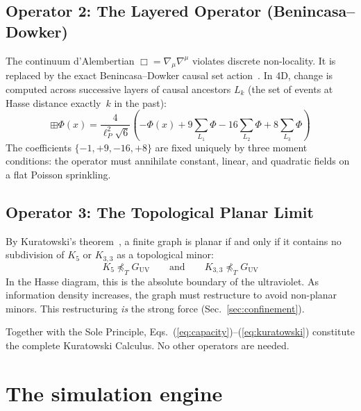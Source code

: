 \documentclass[aps,prd,twocolumn,superscriptaddress,nofootinbib,amsmath,amssymb,longbibliography]{revtex4-2}
\newcommand{\lp}{\ell_P}
\begin{document}
\subsection{Operator 2: The Layered Operator (Benincasa--Dowker)}

The continuum d'Alembertian $\Box = \nabla_\mu \nabla^\mu$ violates
discrete non-locality.  It is replaced by the exact Benincasa--Dowker
causal set action~\cite{benincasa2010}.
In 4D, change is computed across successive layers of causal ancestors
$L_k$ (the set of events at Hasse distance exactly~$k$ in the past):
\begin{equation}\label{eq:box}
  \boxplus\Phi(x) = \frac{4}{\lp^2\sqrt{6}}\left(
    -\Phi(x)
    + 9\!\sum_{L_1}\!\Phi
    - 16\!\sum_{L_2}\!\Phi
    + 8\!\sum_{L_3}\!\Phi
  \right)
\end{equation}
The coefficients $\{-1, +9, -16, +8\}$ are fixed uniquely by three
moment conditions: the operator must annihilate constant, linear,
and quadratic fields on a flat Poisson sprinkling.

\subsection{Operator 3: The Topological Planar Limit}

By Kuratowski's theorem~\cite{kuratowski1930}, a finite graph is planar
if and only if it contains no subdivision of $K_5$ or $K_{3,3}$ as a
topological minor:
\begin{equation}\label{eq:kuratowski}
  K_5 \not\preceq_T G_{\text{UV}}
  \qquad\text{and}\qquad
  K_{3,3} \not\preceq_T G_{\text{UV}}
\end{equation}
In the Hasse diagram, this is the absolute boundary of the ultraviolet.
As information density increases, the graph must restructure to avoid
non-planar minors.  This restructuring \emph{is} the strong force
(Sec.~\ref{sec:confinement}).

Together with the Sole Principle, Eqs.~(\ref{eq:capacity})--(\ref{eq:kuratowski}) constitute the complete Kuratowski Calculus.
No other operators are needed.

\section{The simulation engine}\label{sec:engine}
\end{document}
